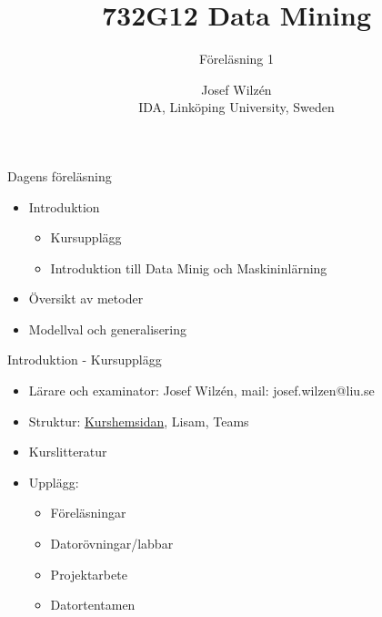 \documentclass[10pt,english]{beamer}
\title{732G12 Data Mining}
\subtitle{Föreläsning 1}
\date{}
\author{Josef Wilzén \\ IDA, Linköping University, Sweden}
\begin{document}
\maketitle

\begin{frame}{Dagens föreläsning}
    \begin{itemize}
        \item Introduktion
        \begin{itemize}
            \item Kursupplägg
            \item Introduktion till Data Minig och Maskininlärning
        \end{itemize}
        \item Översikt av metoder
        \item Modellval och generalisering
    \end{itemize}
\end{frame}

\begin{frame}{Introduktion - Kursupplägg}
    \begin{itemize}
        \item Lärare och examinator: Josef Wilzén, mail: josef.wilzen@liu.se
        \item Struktur:  \href{https://www.ida.liu.se/~732G12/info/courseinfo.sv.shtml}{Kurshemsidan}, Lisam, Teams
        \item Kurslitteratur
        \item Upplägg: 
        \begin{itemize}
            \item Föreläsningar
            \item Datorövningar/labbar
            \item Projektarbete
            \item Datortentamen
        \end{itemize}
    \end{itemize}
    
\end{frame}
\end{document}
